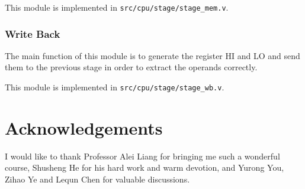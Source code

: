 \documentclass{article}
\begin{document}
This module is implemented in \texttt{src/cpu/stage/stage\_mem.v}.

\newpage
\subsubsection{Write Back}
The main function of this module is to generate the register HI and LO and send them to the previous stage in order to extract the operands correctly.


This module is implemented in \texttt{src/cpu/stage/stage\_wb.v}.


%

%
%


%
%

\section{Acknowledgements}
I would like to thank Professor Alei Liang for bringing me such a wonderful course, Shusheng He for his hard work and warm devotion, and Yurong You, Zihao Ye and Lequn Chen for valuable discussions.
\end{document}
